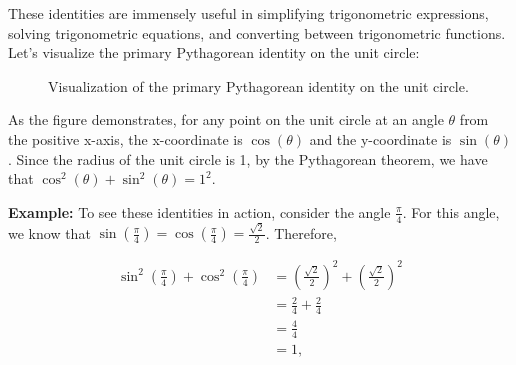 \documentclass[a4paper,12pt]{book}
\begin{document}
These identities are immensely useful in simplifying trigonometric expressions, solving trigonometric equations, and converting between trigonometric functions. Let's visualize the primary Pythagorean identity on the unit circle:

\begin{figure}[ht]
\centering
{}
\caption{Visualization of the primary Pythagorean identity on the unit circle.}
\label{fig:unitcircle_pythagorean}
\end{figure}

As the figure demonstrates, for any point on the unit circle at an angle $\theta$ from the positive x-axis, the x-coordinate is $\cos(\theta)$ and the y-coordinate is $\sin(\theta)$. Since the radius of the unit circle is 1, by the Pythagorean theorem, we have that $\cos^2(\theta) + \sin^2(\theta) = 1^2$.

\textbf{Example:} To see these identities in action, consider the angle $\frac{\pi}{4}$. For this angle, we know that $\sin\left(\frac{\pi}{4}\right) = \cos\left(\frac{\pi}{4}\right) = \frac{\sqrt{2}}{2}$. Therefore,

\begin{align*}
    \sin^2\left(\frac{\pi}{4}\right) + \cos^2\left(\frac{\pi}{4}\right) &= \left(\frac{\sqrt{2}}{2}\right)^2 + \left(\frac{\sqrt{2}}{2}\right)^2 \\
    &= \frac{2}{4} + \frac{2}{4} \\
    &= \frac{4}{4} \\
    &= 1,
\end{align*}
\end{document}
